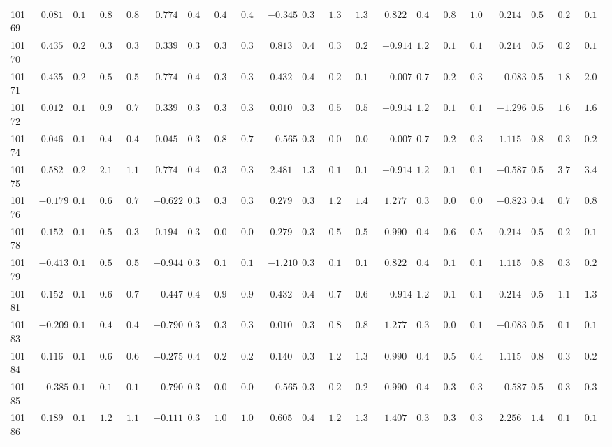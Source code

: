 \documentclass[6pt]{article}
\begin{document}
\begin{landscape}
{\begin{longtable}{lrrrrrrrrrrrrrrrrrrrr}
\label{data}
10169&$ 0.081$&$0.188$&$0.888$&$0.884$&$ 0.774$&$0.401$&$0.405$&$0.433$&$-0.345$&$0.341$&$1.313$&$1.394$&$ 0.822$&$0.443$&$0.896$&$1.063$&$ 0.214$&$0.594$&$0.216$&$0.194$\tabularnewline
10170&$ 0.435$&$0.216$&$0.331$&$0.341$&$ 0.339$&$0.388$&$0.339$&$0.339$&$ 0.813$&$0.497$&$0.318$&$0.249$&$-0.914$&$1.254$&$0.135$&$0.149$&$ 0.214$&$0.594$&$0.256$&$0.188$\tabularnewline
10171&$ 0.435$&$0.216$&$0.568$&$0.585$&$ 0.774$&$0.401$&$0.317$&$0.325$&$ 0.432$&$0.415$&$0.202$&$0.149$&$-0.007$&$0.714$&$0.299$&$0.321$&$-0.083$&$0.547$&$1.865$&$2.092$\tabularnewline
10172&$ 0.012$&$0.184$&$0.999$&$0.735$&$ 0.339$&$0.388$&$0.336$&$0.333$&$ 0.010$&$0.363$&$0.536$&$0.587$&$-0.914$&$1.254$&$0.135$&$0.149$&$-1.296$&$0.509$&$1.656$&$1.655$\tabularnewline
10174&$ 0.046$&$0.186$&$0.467$&$0.460$&$ 0.045$&$0.393$&$0.810$&$0.799$&$-0.565$&$0.334$&$0.044$&$0.045$&$-0.007$&$0.714$&$0.299$&$0.321$&$ 1.115$&$0.851$&$0.303$&$0.292$\tabularnewline
10175&$ 0.582$&$0.233$&$2.160$&$1.196$&$ 0.774$&$0.401$&$0.317$&$0.325$&$ 2.481$&$1.316$&$0.105$&$0.119$&$-0.914$&$1.254$&$0.135$&$0.149$&$-0.587$&$0.505$&$3.794$&$3.400$\tabularnewline
10176&$-0.179$&$0.176$&$0.651$&$0.702$&$-0.622$&$0.399$&$0.340$&$0.354$&$ 0.279$&$0.393$&$1.286$&$1.460$&$ 1.277$&$0.383$&$0.045$&$0.047$&$-0.823$&$0.499$&$0.796$&$0.836$\tabularnewline
10178&$ 0.152$&$0.192$&$0.554$&$0.392$&$ 0.194$&$0.389$&$0.058$&$0.058$&$ 0.279$&$0.393$&$0.537$&$0.513$&$ 0.990$&$0.414$&$0.669$&$0.586$&$ 0.214$&$0.594$&$0.256$&$0.188$\tabularnewline
10179&$-0.413$&$0.169$&$0.513$&$0.532$&$-0.944$&$0.376$&$0.155$&$0.162$&$-1.210$&$0.340$&$0.129$&$0.119$&$ 0.822$&$0.443$&$0.131$&$0.133$&$ 1.115$&$0.851$&$0.303$&$0.292$\tabularnewline
10181&$ 0.152$&$0.192$&$0.669$&$0.743$&$-0.447$&$0.403$&$0.984$&$0.992$&$ 0.432$&$0.415$&$0.764$&$0.654$&$-0.914$&$1.254$&$0.135$&$0.149$&$ 0.214$&$0.594$&$1.183$&$1.322$\tabularnewline
10183&$-0.209$&$0.175$&$0.441$&$0.436$&$-0.790$&$0.389$&$0.316$&$0.340$&$ 0.010$&$0.363$&$0.863$&$0.820$&$ 1.277$&$0.383$&$0.098$&$0.109$&$-0.083$&$0.547$&$0.104$&$0.101$\tabularnewline
10184&$ 0.116$&$0.190$&$0.662$&$0.648$&$-0.275$&$0.402$&$0.257$&$0.253$&$ 0.140$&$0.376$&$1.263$&$1.339$&$ 0.990$&$0.414$&$0.528$&$0.497$&$ 1.115$&$0.851$&$0.303$&$0.292$\tabularnewline
10185&$-0.385$&$0.170$&$0.159$&$0.141$&$-0.790$&$0.389$&$0.054$&$0.055$&$-0.565$&$0.334$&$0.295$&$0.282$&$ 0.990$&$0.414$&$0.383$&$0.393$&$-0.587$&$0.505$&$0.339$&$0.307$\tabularnewline
10186&$ 0.189$&$0.195$&$1.271$&$1.106$&$-0.111$&$0.398$&$1.043$&$1.019$&$ 0.605$&$0.448$&$1.257$&$1.383$&$ 1.407$&$0.376$&$0.389$&$0.301$&$ 2.256$&$1.456$&$0.164$&$0.191$\tabularnewline

\end{longtable}}
\end{landscape}
\end{document}
